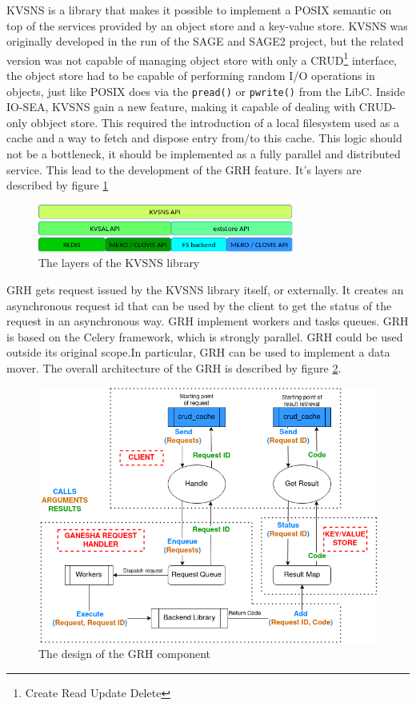 KVSNS is a library that makes it possible to implement a POSIX semantic on top of the services provided by an
object store and a key-value store. KVSNS was originally developed in the run of the SAGE and SAGE2 project, but
the related version was not capable of managing object store with only a CRUD\footnote{Create Read Update Delete}
interface, the object store had to be capable of performing random I/O operations in objects, just like POSIX
does via the \verb|pread()| or \verb|pwrite()| from the LibC. Inside IO-SEA, KVSNS gain a new feature, making it
capable of dealing with CRUD-only obbject store. This required the introduction of a local filesystem used as
a cache and a way to fetch and dispose entry from/to this cache. This logic should not be a bottleneck, it should
be implemented as a fully parallel and distributed service. This lead to the development of the GRH feature.
It's layers are described by figure \ref{fig:kvsns}

\begin{figure}[H]
    \centering
    \includegraphics[width=0.75\textwidth]{FIGS/KVSNS_architecture.png}
    \caption[KVSNS layers]{ The layers of the KVSNS library}
    \label{fig:kvsns}
\end{figure}

GRH gets request issued by the KVSNS library itself, or externally. It creates an asynchronous request id that
can be used by the client to get the status of the request in an asynchronous way. GRH implement workers and 
tasks queues. GRH is based on the Celery framework, which is strongly parallel. GRH could be used outside its
original scope.In particular, GRH can be used to implement a data mover. The overall architecture of the GRH is
described by figure \ref{fig:grh}. 

\begin{figure}[H]
    \centering
    \includegraphics[width=\textwidth]{FIGS/GRH.png}
    \caption[GRH architecture]{ The design of the GRH component}
    \label{fig:grh}
\end{figure}

